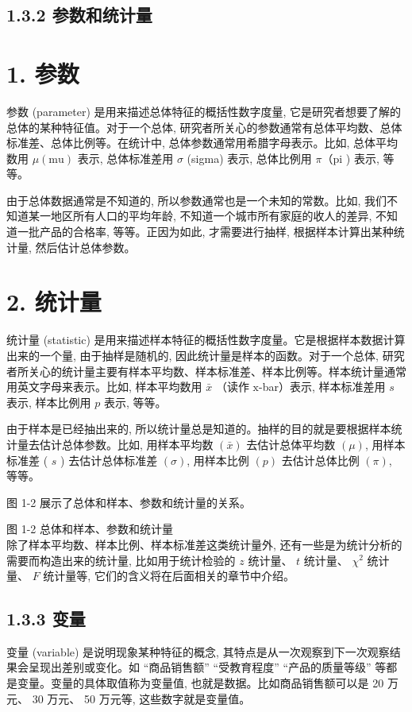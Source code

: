 \documentclass[10pt]{article}
\begin{document}
\begin{CJK*}{UTF8}{bsmi}
\subsection*{1.3.2 参数和统计量}
\section*{1. 参数}
参数 (parameter) 是用来描述总体特征的概括性数字度量, 它是研究者想要了解的总体的某种特征值。对于一个总体, 研究者所关心的参数通常有总体平均数、总体标准差、总体比例等。在统计中, 总体参数通常用希腊字母表示。比如, 总体平均数用 $\mu(\mathrm{mu})$ 表示, 总体标准差用 $\sigma$ (sigma) 表示, 总体比例用 $\pi （ \mathrm{pi}$ ) 表示, 等等。

由于总体数据通常是不知道的, 所以参数通常也是一个未知的常数。比如, 我们不知道某一地区所有人口的平均年龄, 不知道一个城市所有家庭的收人的差异, 不知道一批产品的合格率, 等等。正因为如此, 才需要进行抽样, 根据样本计算出某种统计量, 然后估计总体参数。

\section*{2. 统计量}
统计量 (statistic) 是用来描述样本特征的概括性数字度量。它是根据样本数据计算出来的一个量, 由于抽样是随机的, 因此统计量是样本的函数。对于一个总体, 研究者所关心的统计量主要有样本平均数、样本标准差、样本比例等。样本统计量通常用英文字母来表示。比如, 样本平均数用 $\bar{x}$ （读作 $\mathrm{x}$-bar）表示, 样本标准差用 $s$ 表示, 样本比例用 $p$ 表示, 等等。

由于样本是已经抽出来的, 所以统计量总是知道的。抽样的目的就是要根据样本统计量去估计总体参数。比如, 用样本平均数 $(\bar{x})$ 去估计总体平均数 $(\mu)$, 用样本标准差 ( $s$ ) 去估计总体标准差 $(\sigma)$, 用样本比例 $(p)$ 去估计总体比例 $(\pi)$, 等等。

图 1-2 展示了总体和样本、参数和统计量的关系。

\begin{center}
\end{center}

图 1-2 总体和样本、参数和统计量\\
除了样本平均数、样本比例、样本标准差这类统计量外, 还有一些是为统计分析的需要而构造出来的统计量, 比如用于统计检验的 $z$ 统计量、 $t$ 统计量、 $\chi^{2}$ 统计量、 $F$ 统计量等, 它们的含义将在后面相关的章节中介绍。

\subsection*{1.3.3 变量}
变量 (variable) 是说明现象某种特征的概念, 其特点是从一次观察到下一次观察结果会呈现出差别或变化。如 “商品销售额” “受教育程度” “产品的质量等级” 等都是变量。变量的具体取值称为变量值, 也就是数据。比如商品销售额可以是 20 万元、 30 万元、 50 万元等, 这些数字就是变量值。


\end{CJK*}
\end{document}
